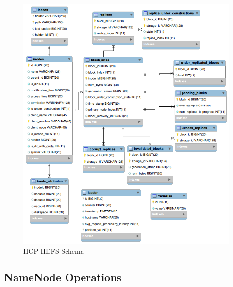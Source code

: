 \pagebreak
\begin{figure}
  \centering
 \includegraphics[scale=0.5]{figs/preliminar/HOP_HDFS_Schema.png}
  \caption{HOP-HDFS Schema}
  \label{fig:HDFS_table_schema}
\end{figure}




\subsection{NameNode Operations}

